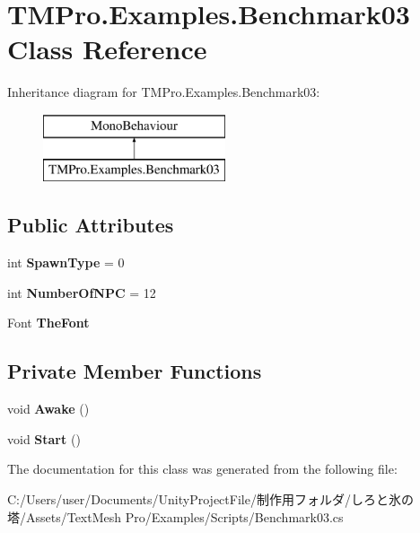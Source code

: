 \hypertarget{class_t_m_pro_1_1_examples_1_1_benchmark03}{}\section{T\+M\+Pro.\+Examples.\+Benchmark03 Class Reference}
\label{class_t_m_pro_1_1_examples_1_1_benchmark03}
Inheritance diagram for T\+M\+Pro.\+Examples.\+Benchmark03\+:\begin{figure}[H]
\begin{center}
\leavevmode
\includegraphics[height=2.000000cm]{class_t_m_pro_1_1_examples_1_1_benchmark03}
\end{center}
\end{figure}
\subsection*{Public Attributes}
\begin{DoxyCompactItemize}
\item 
\mbox{\label{class_t_m_pro_1_1_examples_1_1_benchmark03_ae0595654d8160315bd25697058905374}} 
int {\bfseries Spawn\+Type} = 0
\item 
\mbox{\label{class_t_m_pro_1_1_examples_1_1_benchmark03_ad5c82c8274151538fc80d71b6957fdbe}} 
int {\bfseries Number\+Of\+N\+PC} = 12
\item 
\mbox{\label{class_t_m_pro_1_1_examples_1_1_benchmark03_ad5ac07c246de5f50a0272846a75d64ad}} 
Font {\bfseries The\+Font}
\end{DoxyCompactItemize}
\subsection*{Private Member Functions}
\begin{DoxyCompactItemize}
\item 
\mbox{\label{class_t_m_pro_1_1_examples_1_1_benchmark03_a6bac045f150b54ef8be968b836d8dd52}} 
void {\bfseries Awake} ()
\item 
\mbox{\label{class_t_m_pro_1_1_examples_1_1_benchmark03_a91e862bb55bb6a47ce5af531634addf7}} 
void {\bfseries Start} ()
\end{DoxyCompactItemize}


The documentation for this class was generated from the following file\+:\begin{DoxyCompactItemize}
\item 
C\+:/\+Users/user/\+Documents/\+Unity\+Project\+File/制作用フォルダ/しろと氷の塔/\+Assets/\+Text\+Mesh Pro/\+Examples/\+Scripts/Benchmark03.\+cs\end{DoxyCompactItemize}
